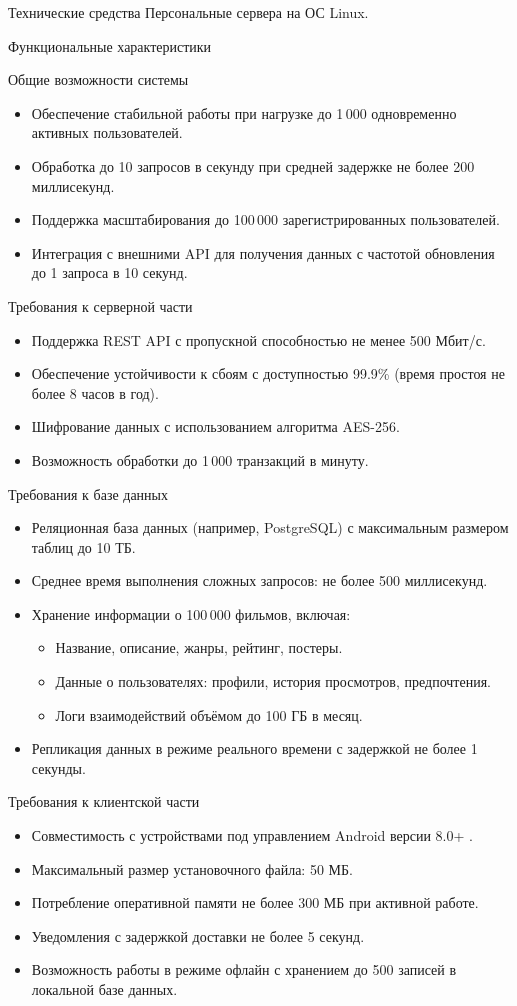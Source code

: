 Технические средства
Персональные сервера на ОС Linux.

Функциональные характеристики

Общие возможности системы
\begin{itemize}
	\item Обеспечение стабильной работы при нагрузке до 1\,000 одновременно активных пользователей.
	\item Обработка до 10 запросов в секунду при средней задержке не более 200 миллисекунд.
	\item Поддержка масштабирования до 100\,000 зарегистрированных пользователей.
	\item Интеграция с внешними API для получения данных с частотой обновления до 1 запроса в 10 секунд.
\end{itemize}

Требования к серверной части
\begin{itemize}
	\item Поддержка REST API с пропускной способностью не менее 500 Мбит/с.
	\item Обеспечение устойчивости к сбоям с доступностью 99.9\% (время простоя не более 8 часов в год).
	\item Шифрование данных с использованием алгоритма AES-256.
	\item Возможность обработки до 1\,000 транзакций в минуту.
\end{itemize}

Требования к базе данных
\begin{itemize}
	\item Реляционная база данных (например, PostgreSQL) с максимальным размером таблиц до 10 ТБ.
	\item Среднее время выполнения сложных запросов: не более 500 миллисекунд.
	\item Хранение информации о 100\,000 фильмов, включая:
	\begin{itemize}
		\item Название, описание, жанры, рейтинг, постеры.
		\item Данные о пользователях: профили, история просмотров, предпочтения.
		\item Логи взаимодействий объёмом до 100 ГБ в месяц.
	\end{itemize}
	\item Репликация данных в режиме реального времени с задержкой не более 1 секунды.
\end{itemize}

Требования к клиентской части
\begin{itemize}
	\item Совместимость с устройствами под управлением Android версии 8.0+ .
	\item Максимальный размер установочного файла: 50 МБ.
	\item Потребление оперативной памяти не более 300 МБ при активной работе.
	\item Уведомления с задержкой доставки не более 5 секунд.
	\item Возможность работы в режиме офлайн с хранением до 500 записей в локальной базе данных.
\end{itemize}

